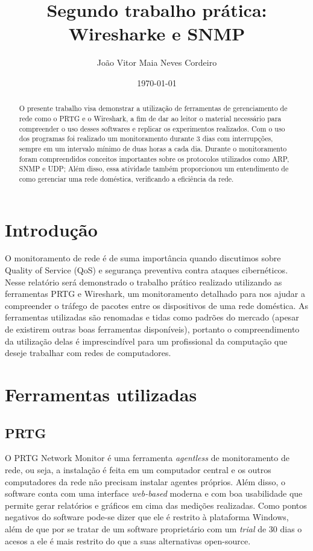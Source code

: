 \documentclass[12pt]{article}
\author{João Vitor Maia Neves Cordeiro}
\title{Segundo trabalho prática: Wiresharke e SNMP}
\date{\today}
\begin{document}
\maketitle

\begin{abstract}
O presente trabalho visa demonstrar a utilização de ferramentas de gerenciamento de rede como o PRTG e o Wireshark, a fim de dar ao leitor o material necessário para compreender o uso desses softwares e replicar os experimentos realizados. Com o uso dos programas foi realizado um monitoramento durante 3 dias com interrupções, sempre em um intervalo mínimo de duas horas a cada dia. Durante o monitoramento foram compreendidos conceitos importantes sobre os protocolos utilizados como ARP, SNMP e UDP; Além disso, essa atividade também proporcionou um entendimento de como gerenciar uma rede doméstica, verificando a eficiência da rede.
\end{abstract}

\section{Introdução}

O monitoramento de rede é de suma importância quando discutimos sobre Quality of Service (QoS) e segurança preventiva contra ataques cibernéticos. Nesse relatório será demonstrado o trabalho prático realizado utilizando as ferramentas PRTG e Wireshark, um monitoramento detalhado para nos ajudar a compreender o tráfego de pacotes entre os dispositivos de uma rede doméstica. As ferramentas utilizadas são renomadas e tidas como padrões do mercado (apesar de existirem outras boas ferramentas disponíveis), portanto o compreendimento da utilização delas é imprescindível para um profissional da computação que deseje trabalhar com redes de computadores.

\section{Ferramentas utilizadas}

\subsection{PRTG}

O PRTG Network Monitor é uma ferramenta \emph{agentless} de monitoramento de rede, ou seja, a instalação é feita em um computador central e os outros computadores da rede não precisam instalar agentes próprios. Além disso, o software conta com uma interface \emph{web-based} moderna e com boa usabilidade que permite gerar relatórios e gráficos em cima das medições realizadas. Como pontos negativos do software pode-se dizer que ele é restrito à plataforma Windows, além de que por se tratar de um software proprietário com um \emph{trial} de 30 dias o acesos a ele é mais restrito do que a suas alternativas open-source.
\end{document}
